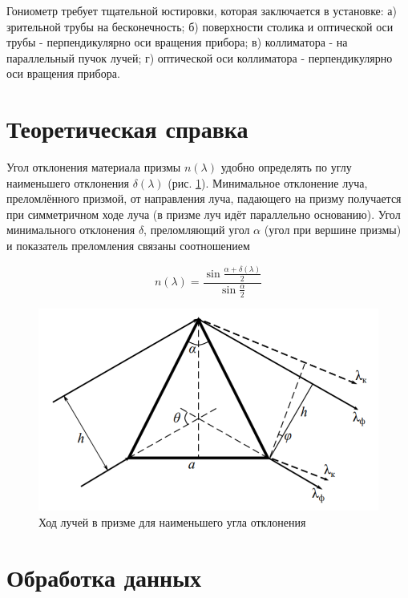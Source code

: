 	Гониометр требует тщательной юстировки, которая заключается в установке: а) зрительной трубы на бесконечность; б) поверхности столика и оптической оси трубы - перпендикулярно оси вращения прибора; в) коллиматора - на параллельный пучок лучей; г) оптической оси коллиматора - перпендикулярно оси вращения прибора.
	
	\section*{Теоретическая справка}
	
	Угол отклонения материала призмы $n(\lambda )$ удобно определять по углу наименьшего отклонения $\delta (\lambda )$ (рис. \ref{fig:teor_1}). Минимальное отклонение луча, преломлённого призмой, от  направления луча, падающего на призму получается при симметричном ходе луча (в призме луч идёт параллельно основанию). Угол минимального отклонения $\delta$, преломляющий угол $\alpha$ (угол при вершине призмы) и показатель преломления связаны соотношением

	\begin{equation} \label{equation:n(lambda)}
		n(\lambda) = \frac{\sin \frac{\alpha + \delta (\lambda )}{2}}{\sin \frac{\alpha}{2}}
	\end{equation}
	
	\begin{figure}[h!]
		\centering
		\includegraphics[scale=0.5]{images/teor_1.png}
		\caption{Ход лучей в призме для наименьшего угла отклонения}
		\label{fig:teor_1}
	\end{figure}
	
	\section*{Обработка данных}
	
